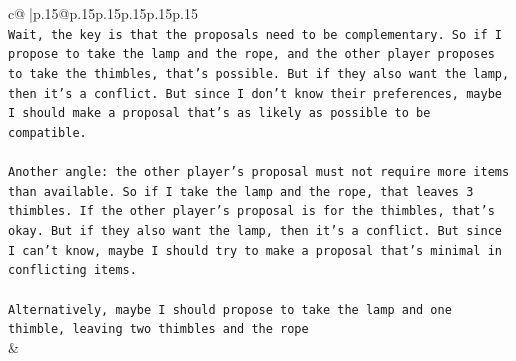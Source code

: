 \documentclass{article}
\begin{document}
{\begin{supertabular}{c@{$\;$}|p{.15\linewidth}@{}p{.15\linewidth}p{.15\linewidth}p{.15\linewidth}p{.15\linewidth}p{.15\linewidth}}
{{{\\ 
\texttt{Wait, the key is that the proposals need to be complementary. So if I propose to take the lamp and the rope, and the other player proposes to take the thimbles, that's possible. But if they also want the lamp, then it's a conflict. But since I don't know their preferences, maybe I should make a proposal that's as likely as possible to be compatible.} \\
\\ 
\texttt{Another angle: the other player's proposal must not require more items than available. So if I take the lamp and the rope, that leaves 3 thimbles. If the other player's proposal is for the thimbles, that's okay. But if they also want the lamp, then it's a conflict. But since I can't know, maybe I should try to make a proposal that's minimal in conflicting items.} \\
\\ 
\texttt{Alternatively, maybe I should propose to take the lamp and one thimble, leaving two thimbles and the rope} \\
            }
        }
    }
    & \\ \\


\end{supertabular}}
\end{document}
